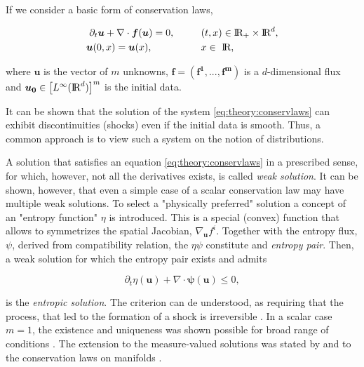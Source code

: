 \documentclass[11pt,a4paper,headinclude=true,DIV=14,BCOR=8mm,chapterprefix,listof=totoc,twoside,openright,abstracton]{scrbook}
\begin{document}
If we consider a basic form of conservation laws, 

\begin{align} 
\partial_t\boldsymbol{u} + \nabla\cdot\boldsymbol{f}(\boldsymbol{u}) = 0, \hspace{10mm} &(t,x)\in \text{I\!R}_{+}\times\text{I\!R}^d , \\
\boldsymbol{u}(0, x) = \boldsymbol{u}(x), \hspace{18mm} &x\in \text{ I\!R},
\label{eq:theory:conservlaws}
\end{align}

where $\boldsymbol{u}$ is the vector of $m$ unknowns, $\boldsymbol{f}=(\boldsymbol{\boldsymbol{f}^1,...,\boldsymbol{f}^m})$ is a $d$-dimensional flux and $\boldsymbol{u_0}\in\big[L^{\infty}(\text{I\!R}^d)\big]^m$ is the initial data. 

It can be shown that the solution of the system \ref{eq:theory:conservlaws} can exhibit discontinuities (shocks) even if the initial data is smooth. Thus, a common approach is to view such a system on the notion of distributions. 

A solution that satisfies an equation \ref{eq:theory:conservlaws} in a prescribed sense, for which, however, not all the derivatives exists, is called \textit{weak solution}. It can be shown, however, that even a simple case of a scalar conservation law may have multiple weak solutions. To select a "physically preferred" solution a concept of an "entropy function" $\eta$ is introduced. This is a special (convex) function that allows to symmetrizes the spatial Jacobian, $\nabla_{\boldsymbol{u}}f^i$. Together with the entropy flux, $\psi$, derived from compatibility relation, the $\eta\psi$ constitute and \textit{entropy pair}. Then, a weak solution for which the entropy pair exists and admits

\begin{equation}
\partial_t\eta(\boldsymbol{u}) + \nabla\cdot\boldsymbol{\psi}(\boldsymbol{u})\leq 0,
\label{eq:theory:nummeth:entropic}
\end{equation}

is the \textit{entropic solution}. The criterion can de understood, as requiring that the process, that led to the formation of a shock is irreversible \cite{LeVeque:1992}. In a scalar case $m=1$, the existence and uniqueness was shown possible for broad range of conditions \cite{Kruzkov:1970}. The extension to the  measure-valued solutions was stated by \cite{DiPerna:1985} and to the conservation laws on manifolds \cite{Benartzi:2007}. 
\end{document}
